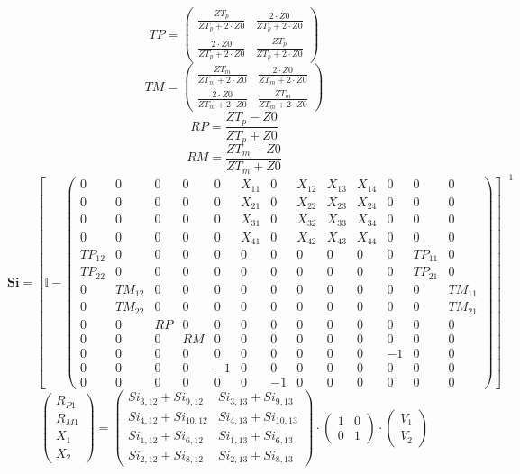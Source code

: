 \documentclass[10pt]{article} \usepackage{amsmath} \usepackage{bbold}
\begin{document}
\[ TP=\left(\begin{array}{cc} \frac{ZT_p}{ZT_p+2\cdot Z0} &
\frac{2\cdot Z0}{ZT_p+2\cdot Z0} \\ \frac{2\cdot Z0}{ZT_p+2\cdot Z0} &
\frac{ZT_p}{ZT_p+2\cdot Z0} \end{array}\right) \]
\[ TM=\left(\begin{array}{cc} \frac{ZT_m}{ZT_m+2\cdot Z0} &
\frac{2\cdot Z0}{ZT_m+2\cdot Z0} \\ \frac{2\cdot Z0}{ZT_m+2\cdot Z0} &
\frac{ZT_m}{ZT_m+2\cdot Z0} \end{array}\right) \]
\[ RP=\frac{ ZT_p -Z0}{ ZT_p +Z0} \]
\[ RM=\frac{ ZT_m -Z0}{ ZT_m +Z0} \]
\[ \mathbf{Si} = \left[ \mathbb{I}  -
\left(\begin{array}{ccccccccccccc} 0 & 0 & 0 & 0 & 0 & X_{11} & 0 &
X_{12} & X_{13} & X_{14} & 0 & 0 & 0 \\ 0 & 0 & 0 & 0 & 0 & X_{21} & 0
& X_{22} & X_{23} & X_{24} & 0 & 0 & 0 \\ 0 & 0 & 0 & 0 & 0 & X_{31} &
0 & X_{32} & X_{33} & X_{34} & 0 & 0 & 0 \\ 0 & 0 & 0 & 0 & 0 & X_{41}
& 0 & X_{42} & X_{43} & X_{44} & 0 & 0 & 0 \\ TP_{12} & 0 & 0 & 0 & 0
& 0 & 0 & 0 & 0 & 0 & 0 & TP_{11} & 0 \\ TP_{22} & 0 & 0 & 0 & 0 & 0 &
0 & 0 & 0 & 0 & 0 & TP_{21} & 0 \\ 0 & TM_{12} & 0 & 0 & 0 & 0 & 0 & 0
& 0 & 0 & 0 & 0 & TM_{11} \\ 0 & TM_{22} & 0 & 0 & 0 & 0 & 0 & 0 & 0 &
0 & 0 & 0 & TM_{21} \\ 0 & 0 & RP & 0 & 0 & 0 & 0 & 0 & 0 & 0 & 0 & 0
& 0 \\ 0 & 0 & 0 & RM & 0 & 0 & 0 & 0 & 0 & 0 & 0 & 0 & 0 \\ 0 & 0 & 0
& 0 & 0 & 0 & 0 & 0 & 0 & 0 & -1 & 0 & 0 \\ 0 & 0 & 0 & 0 & -1 & 0 & 0
& 0 & 0 & 0 & 0 & 0 & 0 \\ 0 & 0 & 0 & 0 & 0 & 0 & -1 & 0 & 0 & 0 & 0
& 0 & 0 \end{array}\right) \right]^{-1} \]
\[ \left(\begin{array}{c} R_{P1} \\ R_{M1} \\ X_{1} \\ X_{2}
\end{array}\right)=\left(\begin{array}{cc} Si_{3,12} + Si_{9,12} &
Si_{3,13} + Si_{9,13} \\ Si_{4,12} + Si_{10,12} & Si_{4,13} +
Si_{10,13} \\ Si_{1,12} + Si_{6,12} & Si_{1,13} + Si_{6,13} \\
Si_{2,12} + Si_{8,12} & Si_{2,13} + Si_{8,13} \end{array}\right)\cdot
\left(\begin{array}{cc} 1 & 0 \\ 0 & 1 \end{array}\right)\cdot
\left(\begin{array}{c} V_{1} \\ V_{2} \end{array}\right) \]
\end{document}
